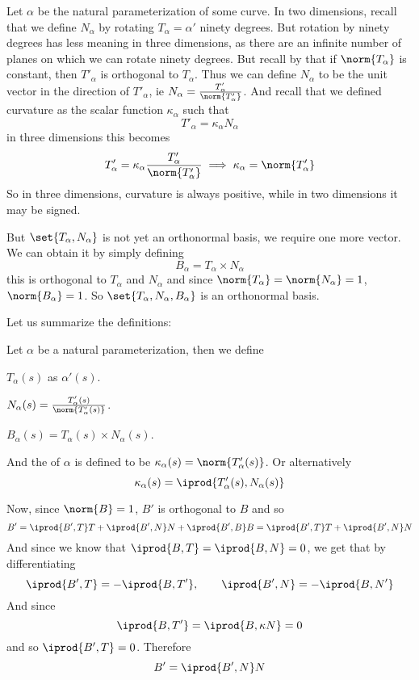 Let $\alpha$ be the natural parameterization of some curve.
In two dimensions, recall that we define $N_\alpha$ by rotating $T_\alpha=\alpha'$ ninety degrees.
But rotation by ninety degrees has less meaning in three dimensions, as there are an infinite number of planes on which we can rotate ninety degrees.
But recall by  that if $\norm{T_\alpha}$ is constant, then $T'_\alpha$ is orthogonal to $T_\alpha$.
Thus we can define $N_\alpha$ to be the unit vector in the direction of $T'_\alpha$, ie $N_\alpha=\frac{T_\alpha'}{\norm{T_\alpha'}}$.
And recall that we defined curvature as the scalar function $\kappa_\alpha$ such that
\[ T'_\alpha = \kappa_\alpha N_\alpha \]
in three dimensions this becomes
\[ T'_\alpha = \kappa_\alpha\frac{T_\alpha'}{\norm{T_\alpha'}} \implies \kappa_\alpha = \norm{T'_\alpha} \]
So in three dimensions, curvature is always positive, while in two dimensions it may be signed.

But $\set{T_\alpha,N_\alpha}$ is not yet an orthonormal basis, we require one more vector.
We can obtain it by simply defining
\[ B_\alpha = T_\alpha\times N_\alpha \]
this is orthogonal to $T_\alpha$ and $N_\alpha$ and since $\norm{T_\alpha}=\norm{N_\alpha}=1$, $\norm{B_\alpha}=1$.
So $\set{T_\alpha,N_\alpha,B_\alpha}$ is an orthonormal basis.

Let us summarize the definitions:

\begin{defn*}

    Let $\alpha$ be a natural parameterization, then we define
    \benum
        \item $T_\alpha(s)$ as $\alpha'(s)$.
        \item $N_\alpha(s)=\frac{T'_\alpha(s)}{\norm{T'_\alpha(s)}}$.
        \item $B_\alpha(s)=T_\alpha(s)\times N_\alpha(s)$.
    \eenum

    And the  of $\alpha$ is defined to be $\kappa_\alpha(s)=\norm{T'_\alpha(s)}$.
    Or alternatively
    \[ \kappa_\alpha(s) = \iprod{T'_\alpha(s), N_\alpha(s)} \]

\end{defn*}

Now, since $\norm{B}=1$, $B'$ is orthogonal to $B$ and so
\[ B' = \iprod{B',T}T + \iprod{B',N}N + \iprod{B',B}B = \iprod{B',T}T + \iprod{B',N}N \]
And since we know that $\iprod{B,T}=\iprod{B,N}=0$, we get that by differentiating
\[ \iprod{B',T} = -\iprod{B,T'},\qquad \iprod{B',N} = -\iprod{B,N'} \]
And since
\[ \iprod{B,T'} = \iprod{B,\kappa N} = 0 \]
and so $\iprod{B',T}=0$.
Therefore
\[ B' = \iprod{B',N}N \]

